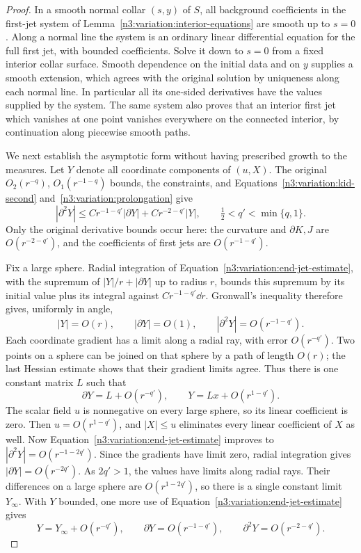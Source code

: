 \begin{proof}
In a smooth normal collar $(s,y)$ of $S$, all background coefficients
in the first-jet system of Lemma~\ref{n3:variation:interior-equations}
are smooth up to $s=0$.  Along a normal line the system is an ordinary
linear differential equation for the full first jet, with bounded
coefficients.  Solve it down to $s=0$ from a fixed interior collar
surface.  Smooth dependence on the initial data and on $y$ supplies
a smooth extension, which agrees with the original solution by
uniqueness along each normal line.  In particular all its one-sided
derivatives have the values supplied by the system.  The same system
also proves that an interior first jet which vanishes at one point
vanishes everywhere on the connected interior, by continuation
along piecewise smooth paths.

We next establish the asymptotic form without having prescribed
growth to the measures.  Let $Y$ denote all coordinate components
of $(u,X)$.  The original $O_2(r^{-q})$, $O_1(r^{-1-q})$ bounds,
the constraints, and Equations~\eqref{n3:variation:kid-second}
and~\eqref{n3:variation:prolongation} give
\begin{equation}
 |\partial^2Y|
    \le C r^{-1-q'}|\partial Y|
          +C r^{-2-q'}|Y|,
 \qquad \tfrac12<q'<\min\{q,1\}.
 \label{n3:variation:end-jet-estimate}
\end{equation}
Only the original derivative bounds occur here: the curvature and
$\partial K,J$ are $O(r^{-2-q'})$, and the coefficients of first
jets are $O(r^{-1-q'})$.

Fix a large sphere.  Radial integration of
Equation~\eqref{n3:variation:end-jet-estimate}, with the supremum of
$|Y|/r+|\partial Y|$ up to radius $r$, bounds this supremum by its
initial value plus its integral against $C r^{-1-q'}\dd r$.
Gronwall's inequality therefore gives, uniformly in angle,
\[
 |Y|=O(r),\qquad |\partial Y|=O(1),\qquad
 |\partial^2Y|=O(r^{-1-q'}).
\]
Each coordinate gradient has a limit along a radial ray, with error
$O(r^{-q'})$.  Two points on a sphere can be joined on that sphere
by a path of length $O(r)$; the last Hessian estimate shows that
their gradient limits agree.  Thus there is one constant matrix $L$
such that
\[
 \partial Y=L+O(r^{-q'}),\qquad
 Y=Lx+O(r^{1-q'}).
\]
The scalar field $u$ is nonnegative on every large sphere, so its
linear coefficient is zero.  Then $u=O(r^{1-q'})$, and
$|X|\le u$ eliminates every linear coefficient of $X$ as well.
Now Equation~\eqref{n3:variation:end-jet-estimate} improves to
$|\partial^2Y|=O(r^{-1-2q'})$.  Since the gradients have limit zero,
radial integration gives $|\partial Y|=O(r^{-2q'})$.  As $2q'>1$,
the values have limits along radial rays.  Their differences on a
large sphere are $O(r^{1-2q'})$, so there is a single constant limit
$Y_\infty$.  With $Y$ bounded, one more use of
Equation~\eqref{n3:variation:end-jet-estimate} gives
\begin{equation}
 Y=Y_\infty+O(r^{-q'}),\qquad
 \partial Y=O(r^{-1-q'}),\qquad
 \partial^2Y=O(r^{-2-q'}).
 \label{n3:variation:unnormalized-asymptote}
\end{equation}


\end{proof}

